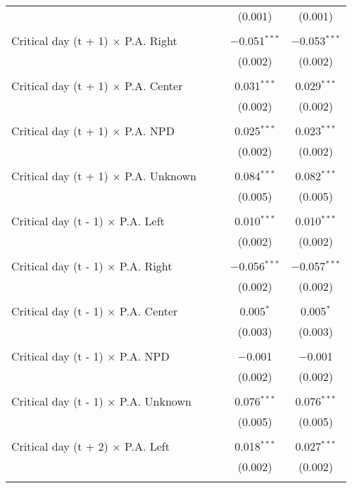 \documentclass[
]{article}
\begin{document}
\begin{table}[!htbp]
{\begin{tabular}{@{\extracolsep{5pt}}lcccc}
  &  &  & (0.001) & (0.001) \\ 
  & & & & \\ 
 Critical day (t + 1) $\times$ P.A. Right &  &  & $-$0.051$^{***}$ & $-$0.053$^{***}$ \\ 
  &  &  & (0.002) & (0.002) \\ 
  & & & & \\ 
 Critical day (t + 1) $\times$ P.A. Center &  &  & 0.031$^{***}$ & 0.029$^{***}$ \\ 
  &  &  & (0.002) & (0.002) \\ 
  & & & & \\ 
 Critical day (t + 1) $\times$ P.A. NPD &  &  & 0.025$^{***}$ & 0.023$^{***}$ \\ 
  &  &  & (0.002) & (0.002) \\ 
  & & & & \\ 
 Critical day (t + 1) $\times$ P.A. Unknown &  &  & 0.084$^{***}$ & 0.082$^{***}$ \\ 
  &  &  & (0.005) & (0.005) \\ 
  & & & & \\ 
 Critical day (t - 1) $\times$ P.A. Left &  &  & 0.010$^{***}$ & 0.010$^{***}$ \\ 
  &  &  & (0.002) & (0.002) \\ 
  & & & & \\ 
 Critical day (t - 1) $\times$ P.A. Right &  &  & $-$0.056$^{***}$ & $-$0.057$^{***}$ \\ 
  &  &  & (0.002) & (0.002) \\ 
  & & & & \\ 
 Critical day (t - 1) $\times$ P.A. Center &  &  & 0.005$^{*}$ & 0.005$^{*}$ \\ 
  &  &  & (0.003) & (0.003) \\ 
  & & & & \\ 
 Critical day (t - 1) $\times$ P.A. NPD &  &  & $-$0.001 & $-$0.001 \\ 
  &  &  & (0.002) & (0.002) \\ 
  & & & & \\ 
 Critical day (t - 1) $\times$ P.A. Unknown &  &  & 0.076$^{***}$ & 0.076$^{***}$ \\ 
  &  &  & (0.005) & (0.005) \\ 
  & & & & \\ 
 Critical day (t + 2) $\times$ P.A. Left &  &  & 0.018$^{***}$ & 0.027$^{***}$ \\ 
  &  &  & (0.002) & (0.002) \\ 
  & & & & \\ 

\end{tabular}}
\end{table}
\end{document}
